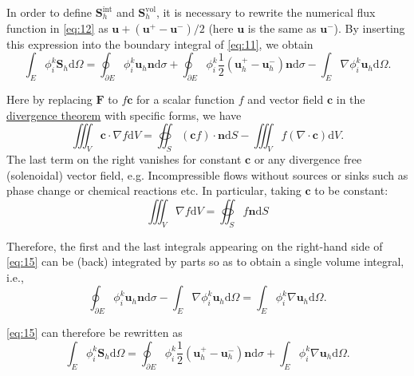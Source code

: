 \documentclass{develop-note}
\begin{document}
In order to define $\mathbf{S}_{h}^{\mathrm{int}}$ and $\mathbf{S}_{h}^{\mathrm{vol}}$, it is necessary to rewrite the numerical flux function in \autoref{eq:12} as $\mathbf{u}+(\mathbf{u}^{+}-\mathbf{u}^{-})/2$ (here $\mathbf{u}$ is the same as $\mathbf{u}^{-}$). By inserting this expression into the boundary integral of \autoref{eq:11}, we obtain
\begin{equation}
  \label{eq:15}
  \int_{E}\phi_{i}^{k}\mathbf{S}_{h}\mathrm{d}\Omega=\oint_{\partial E}\phi_{i}^{k}\mathbf{u}_{h}\mathbf{n}\mathrm{d}\sigma+\oint_{\partial E}\phi_{i}^{k}\dfrac{1}{2}(\mathbf{u}_{h}^{+}-\mathbf{u}_{h}^{-})\mathbf{n}\mathrm{d}\sigma-\int_{E}\nabla\phi_{i}^{k}\mathbf{u}_{h}\mathrm{d}\Omega.
\end{equation}

Here by replacing $\mathbf{F}$ to $f\mathbf{c}$ for a scalar function $f$ and vector field $\mathbf{c}$ in the \href{https://en.wikipedia.org/wiki/Divergence_theorem}{divergence theorem} with specific forms, we have
\begin{equation}
  \iiint_{V}\mathbf{c}\cdot\nabla f\mathrm{d}V=\oiint_{S}(\mathbf{c}f)\cdot\mathbf{n}\mathrm{d}S-\iiint_{V}f(\nabla\cdot\mathbf{c})\mathrm{d}V.
\end{equation}
The last term on the right vanishes for constant $\mathbf{c}$ or any divergence free (solenoidal) vector field, e.g. Incompressible flows without sources or sinks such as phase change or chemical reactions etc. In particular, taking
$\mathbf{c}$ to be constant:
\begin{equation}
  \iiint_{V}\nabla f\mathrm{d}V=\oiint_{S}f\mathbf{n}\mathrm{d}S
\end{equation}

Therefore, the first and the last integrals appearing on the right-hand side of \autoref{eq:15} can be (back) integrated by parts so as to obtain a single volume integral, i.e.,
\begin{equation}
  \oint_{\partial E}\phi_{i}^{k}\mathbf{u}_{h}\mathbf{n}\mathrm{d}\sigma-\int_{E}\nabla\phi_{i}^{k}\mathbf{u}_{h}\mathrm{d}\Omega=\int_{E}\phi_{i}^{k}\nabla\mathbf{u}_{h}\mathrm{d}\Omega.
\end{equation}

\autoref{eq:15} can therefore be rewritten as
\begin{equation}
  \label{eq:18}
  \int_{E}\phi_{i}^{k}\mathbf{S}_{h}\mathrm{d}\Omega=\oint_{\partial E}\phi_{i}^{k}\dfrac{1}{2}(\mathbf{u}_{h}^{+}-\mathbf{u}_{h}^{-})\mathbf{n}\mathrm{d}\sigma+\int_{E}\phi_{i}^{k}\nabla\mathbf{u}_{h}\mathrm{d}\Omega.
\end{equation}
\end{document}
